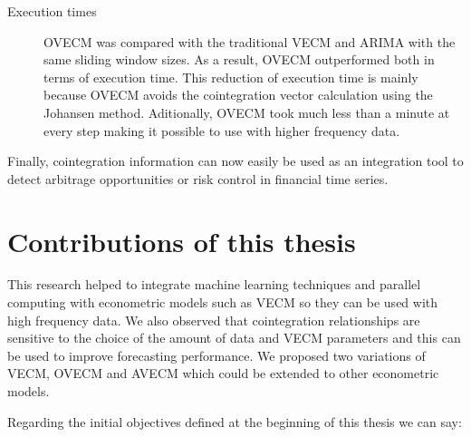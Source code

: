 \begin{description}
\begin{description}
\item[Execution times] OVECM was compared with the traditional VECM and ARIMA
with the same sliding window sizes. As a result, OVECM outperformed both in terms of
execution time. This reduction of execution time is mainly because OVECM avoids the cointegration vector calculation using the Johansen method. Aditionally, OVECM took much less than a minute at every
step making it possible to use with higher frequency data.  
\end{description}
\end{description}
Finally, cointegration information can now easily be used as an integration tool
to detect arbitrage opportunities or risk control in financial time series.

\section{Contributions of this thesis}

This research helped to integrate machine learning techniques and parallel computing with econometric models such as VECM so they can be used with high frequency data. We also observed that cointegration relationships are sensitive to the choice of the amount of data and VECM parameters and this can be used to improve forecasting performance. We proposed two variations of VECM, OVECM and AVECM which could be extended to other econometric models.

Regarding the initial objectives defined at the beginning of this thesis we can say:


